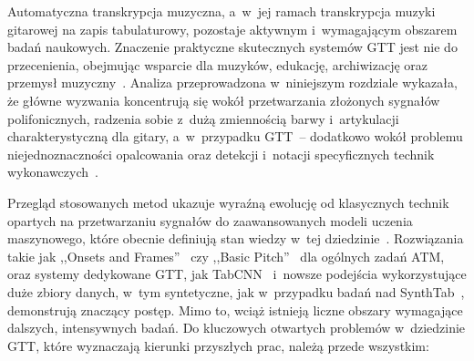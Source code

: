 Automatyczna transkrypcja muzyczna, a~w~jej ramach transkrypcja muzyki gitarowej na zapis tabulaturowy, pozostaje aktywnym i~wymagającym obszarem badań naukowych. Znaczenie praktyczne skutecznych systemów GTT jest nie do przecenienia, obejmując wsparcie dla muzyków, edukację, archiwizację oraz przemysł muzyczny~\autocite{Benetos2019AutomaticMusicTranscription}. Analiza przeprowadzona w~niniejszym rozdziale wykazała, że główne wyzwania koncentrują się wokół przetwarzania złożonych sygnałów polifonicznych, radzenia sobie z~dużą zmiennością barwy i~artykulacji charakterystyczną dla gitary, a~w~przypadku GTT~– dodatkowo wokół problemu niejednoznaczności opalcowania oraz detekcji i~notacji specyficznych technik wykonawczych~\autocite{Wiggins2019TabCNN}.

Przegląd stosowanych metod ukazuje wyraźną ewolucję od klasycznych technik opartych na przetwarzaniu sygnałów do zaawansowanych modeli uczenia maszynowego, które obecnie definiują stan wiedzy w~tej dziedzinie~\autocite{KlapuriDavy2006SignalProcessing,Jamshidi2024SurveyAMT}. Rozwiązania takie jak ,,Onsets and Frames''~\autocite{Hawthorne2018Onsets} czy ,,Basic Pitch''~\autocite{Bittner2022BasicPitch} dla ogólnych zadań ATM, oraz systemy dedykowane GTT, jak TabCNN~\autocite{Wiggins2019TabCNN} i~nowsze podejścia wykorzystujące duże zbiory danych, w~tym syntetyczne, jak w~przypadku badań nad SynthTab~\autocite{Zang2023SynthTab}, demonstrują znaczący postęp. Mimo to, wciąż istnieją liczne obszary wymagające dalszych, intensywnych badań. Do kluczowych otwartych problemów w~dziedzinie GTT, które wyznaczają kierunki przyszłych prac, należą przede wszystkim:
